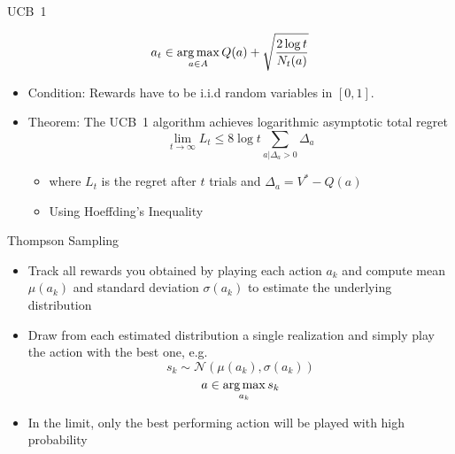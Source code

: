 \documentclass[aspectratio=169]{../latex_main/tntbeamer}  %
\begin{document}
\begin{frame}[c]{UCB~1}
	
			$$a_t \in \operatorname*{arg\,max}_{a \in A} Q(a) + \sqrt{\frac{2\log t }{N_t(a)}} $$
	
	\begin{itemize}

		\item Condition: Rewards have to be i.i.d random variables in $[0,1]$.
		\pause
		\item Theorem: The UCB~1 algorithm achieves logarithmic asymptotic total regret
		$$\lim_{t\to \infty} L_t \leq 8 \log t \sum_{a|\Delta_a>0} \Delta_a $$
		\begin{itemize}
			\item where $L_t$ is the regret after $t$ trials and $\Delta_a = V^* - Q(a)$
			\item Using Hoeffding's Inequality
		\end{itemize}
	\end{itemize}
	
\end{frame}
\begin{frame}[c]{Thompson Sampling}
	
	\begin{itemize}
		\item Track all rewards you obtained by playing each action $a_k$ and compute mean $\mu(a_k)$ and standard deviation $\sigma(a_k)$ to estimate the underlying distribution
		\item Draw from each estimated distribution a single realization and simply play the action with the best one, e.g.
		$$ s_k \sim \mathcal{N}(\mu(a_k), \sigma(a_k))$$
		$$ a \in \operatorname*{arg\,max}_{a_k} s_k$$
		\item In the limit, only the best performing action will be played with high probability
	\end{itemize}
	
\end{frame}
\end{document}
